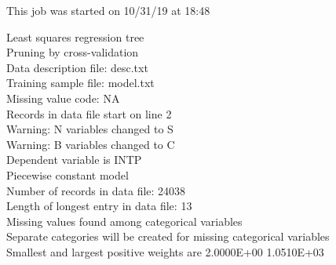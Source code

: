 \documentclass[12pt]{article}
\begin{document}
 This job was started on 10/31/19 at 18:48
  
 Least squares regression tree\\
 Pruning by cross-validation\\
 Data description file: desc.txt\\
 Training sample file: model.txt\\
 Missing value code: NA\\
 Records in data file start on line 2\\
 Warning: N variables changed to S\\
 Warning: B variables changed to C\\
 Dependent variable is INTP\\
 Piecewise constant model\\
 Number of records in data file: 24038\\
 Length of longest entry in data file: 13\\
 Missing values found among categorical variables\\
 Separate categories will be created for missing categorical variables\\
 Smallest and largest positive weights are  2.0000E+00 1.0510E+03\\
  
\end{document}
